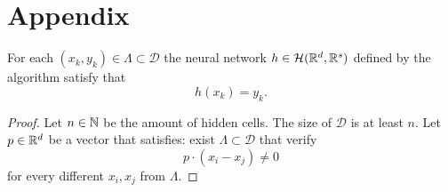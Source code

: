 \section*{Appendix} 

\begin{theorem}
    For each $(x_k, y_k) \in \Lambda \subset \mathcal{D}$ the neural network $h \in \mathcal{H}(\mathbb{R}^d, \mathbb{R}^s)$ 
    defined by the algorithm  
    satisfy that 
    \begin{equation*}
        h(x_k) = y_k.
    \end{equation*}
\end{theorem}
\begin{proof}
    Let $n \in \mathbb{N}$ be the amount of hidden cells. 
    The size of $\mathcal{D}$ is at least $n$. 
    Let $p \in \mathbb{R}^d$ be a vector that satisfies: exist 
    $\Lambda \subset \mathcal{D}$ that verify
    \begin{equation*}
        p \cdot (x_i - x_j) \neq 0
    \end{equation*}
    for every different $x_i, x_j$ from $\Lambda$.
\end{proof}